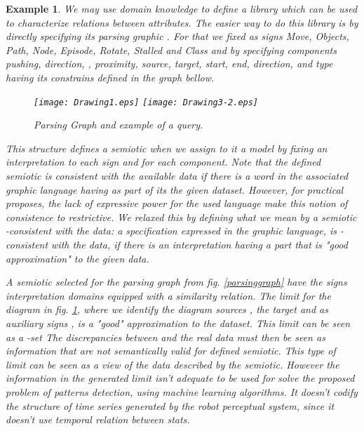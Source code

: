 \documentclass[oribibl]{llncs}
\newtheorem{exam}{Example}
\begin{document}
\begin{exam}
We may use domain knowledge to define a library  which can be used to characterize relations between attributes. The easier way to do this library is by directly specifying its parsing graphic . For that we fixed as signs \emph{Move}, \emph{Objects}, \emph{Path}, \emph{Node}, \emph{Episode}, \emph{Rotate}, \emph{Stalled} and \emph{Class} and by specifying components \emph{pushing}, \emph{direction}, , \emph{proximity}, \emph{source}, \emph{target}, \emph{start}, \emph{end}, \emph{direction},  and \emph{type} having its constrains defined in the graph bellow.
\begin{figure}[h]
    \begin{center}
    \texttt{[image: Drawing1.eps]}
    \texttt{[image: Drawing3-2.eps]}
    \end{center}
    \caption{Parsing Graph and example of a query.}\label{parsinggraph}\label{query1}
\end{figure}

This structure defines a semiotic when we assign to it a model by fixing an interpretation to each sign and for each component. Note that the defined semiotic is consistent with the available data if there is a word in the associated graphic language having as part of its the given dataset. However, for practical proposes, the lack of expressive power for the used language make this notion of consistence to restrictive. We relaxed this by defining what we mean by a semiotic -consistent with the data: a specification expressed in the graphic language, is -consistent with the data, if there is an  interpretation having a part that is "good approximation" to the given data.

A semiotic selected for the parsing graph from fig. \ref{parsinggraph} have the signs interpretation domains equipped with a similarity relation. The limit for the diagram in fig. \ref{query1}, where we identify the diagram sources    , the target  and as auxiliary signs
 , is a "good" approximation to the dataset. This limit can be seen as a -set  The discrepancies between  and the real data must then be seen as information that are not semantically valid for defined semiotic. This type of limit can be seen as a view of the data described by the semiotic. However the information in the generated limit isn't adequate to be used for solve the proposed problem of patterns detection, using machine learning algorithms. It doesn't codify the structure of time series generated by the robot perceptual system, since it doesn't use temporal relation between stats.


\end{exam}
\end{document}
